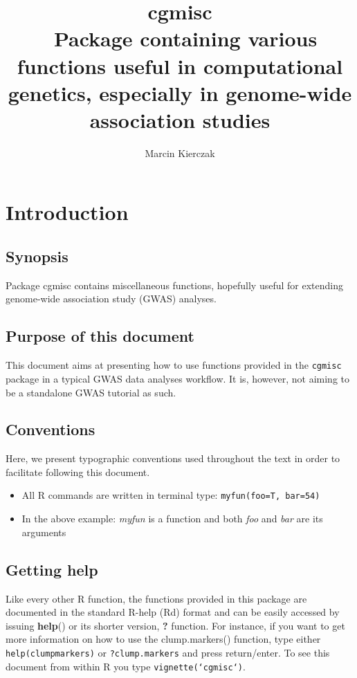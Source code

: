 \documentclass[12pt,a4paper,oneside]{article}\usepackage[]{graphicx}\usepackage[]{color}
\begin{document}
\title{\color{TealBlue} cgmisc \\\ \normalsize Package containing various functions useful in computational genetics, especially in genome-wide association studies}
\author{\color{Orange}Marcin Kierczak}
\maketitle

\newpage

\section*{Introduction}
\subsection*{Synopsis}
\noindent Package cgmisc contains miscellaneous functions, hopefully useful for extending genome-wide association study (GWAS) analyses.

\subsection*{Purpose of this document}
\noindent This document aims at presenting how to use functions provided in the \texttt{cgmisc} package in a typical GWAS data analyses workflow. It is, however, not aiming to be a standalone GWAS tutorial as such.

\subsection*{Conventions}
Here, we present typographic conventions used throughout the text in order to facilitate following this document.
\begin{itemize}
\item{All R commands are written in terminal type: {\tt myfun(foo=T, bar=54)}}
\item{In the above example: \textit{myfun} is a function and both \textit{foo} and \textit{bar} are its arguments}
\end{itemize}

\subsection*{Getting help}
\noindent Like every other R function, the functions provided in this package are documented in the standard R-help (Rd) format and can be easily accessed by issuing \textbf{help}() or its shorter version, \textbf{?} function. For instance, if you want to get more information on how to use the clump.markers() function, type either \texttt{help(clumpmarkers)} or \texttt{?clump.markers} and press return/enter. To see this document from within R you type \texttt{vignette(`cgmisc`)}.
\end{document}
